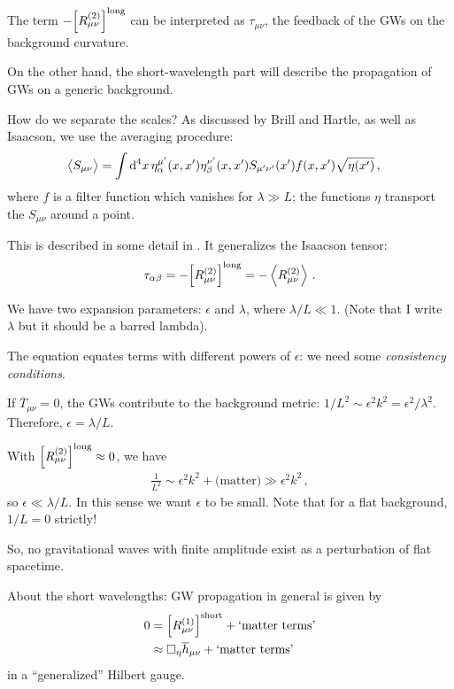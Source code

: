 \documentclass[main.tex]{subfiles}
\begin{document}
The term \(- \qty[ R^{(2)}_{\mu \nu }]^{\text{long}}\) can be interpreted as \(\tau_{\mu \nu }\), the feedback of the GWs on the background curvature. 

On the other hand, the short-wavelength part will describe the propagation of GWs on a generic background.  

How do we separate the scales? As discussed by Brill and Hartle, as well as Isaacson, we use the averaging procedure: 
%
\begin{align}
\expval{S_{\mu \nu }}&= \int \dd[4]{x} \eta^{\mu '}_\alpha (x, x') \eta^{\nu '}_{\beta } (x, x') S_{\mu ' \nu '} (x') f(x, x') \sqrt{\eta (x')}
\,,
\end{align}
%
where \(f\) is a filter function which vanishes for \(\lambda \gg L\); the functions \(\eta \) transport the \(S_{\mu \nu }\) around a point. 

This is described in some detail in \cite[]{misnerGravitation1973}.
It generalizes the Isaacson tensor: 
%
\begin{align}
\tau_{\alpha \beta } = - \qty[R_{\mu \nu }^{(2)}]^{\text{long}} 
= - \expval{R_{\mu \nu }^{(2)}}
\,.
\end{align}

We have two expansion parameters: \(\epsilon \) and \(\lambda \), where \(\lambda / L \ll 1\). 
(Note that I write \(\lambda \) but it should be a barred lambda).

The equation equates terms with different powers of \(\epsilon \): we need some \emph{consistency conditions}. 

If \(\overline{T}_{\mu \nu } = 0\), the GWs contribute to the background metric: \(1 / L^2 \sim \epsilon^2 k^2 = \epsilon^2 / \lambda^2\). 
Therefore, \(\epsilon = \lambda /L\). 

With \(\qty[R^{(2)}_{\mu \nu }]^{\text{long}} \approx 0\), we have 
%
\begin{align}
\frac{1}{L^2} \sim \epsilon^2 k^2 + \text{(matter)} \gg \epsilon^2k^2
\,,
\end{align}
%
so \(\epsilon \ll \lambda /L\). 
In this sense we want \(\epsilon \) to be small. Note that for a flat background, \(1/L = 0 \) strictly! 

So, no gravitational waves with finite amplitude exist as a perturbation of flat spacetime.

About the short wavelengths: GW propagation in general is given by 
%
\begin{align}
0 &= \qty[R_{\mu \nu }^{(1)}]^{\text{short}} + \text{`matter terms'}  \\
&\approx \square_\eta \overline{h}_{\mu \nu } + \text{`matter terms'}
\,
\end{align}
%
in a ``generalized'' Hilbert gauge.
\end{document}
